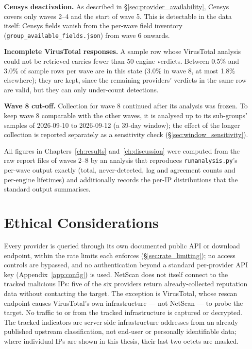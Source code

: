 \textbf{Censys deactivation.} As described in \S\ref{sec:provider_availability}, Censys covers only
waves 2--4 and the start of wave 5. This is detectable in the data itself: Censys fields vanish from
the per-wave field inventory (\texttt{group\_available\_fields.json}) from wave 6 onwards.

\textbf{Incomplete VirusTotal responses.} A sample row whose VirusTotal analysis could not be
retrieved carries fewer than 50 engine verdicts. Between 0.5\% and 3.0\% of sample rows per wave are
in this state (3.0\% in wave 8, at most 1.8\% elsewhere); they are kept, since the remaining providers' verdicts in the same row are valid, but
they can only under-count detections.

\textbf{Wave 8 cut-off.} Collection for wave 8 continued after its analysis was frozen. To keep wave
8 comparable with the other waves, it is analysed up to its sub-groups' samples of 2026-09-10 to
2026-09-12 (a 39-day window); the effect of the longer collection is reported separately as a
sensitivity check (\S\ref{sec:window_sensitivity}).

All figures in Chapters~\ref{ch:results} and~\ref{ch:discussion} were computed from the raw report
files of waves 2--8 by an analysis that reproduces \texttt{runanalysis.py}'s per-wave output exactly
(total, never-detected, lag and agreement counts and per-engine lifetimes) and additionally records
the per-IP distributions that the standard output summarises.

\section{Ethical Considerations}

Every provider is queried through its own documented public API or download endpoint, within the rate
limits each enforces (\S\ref{sec:rate_limiting}); no access controls are bypassed, and no
authentication beyond a standard per-provider API key (Appendix~\ref{app:config}) is used. NetScan
does not itself connect to the tracked malicious IPs: five of the six providers return
already-collected reputation data without contacting the target. The exception is VirusTotal, whose
rescan endpoint causes VirusTotal's own infrastructure --- not NetScan --- to probe the target. No
traffic to or from the tracked infrastructure is captured or decrypted. The tracked indicators are
server-side infrastructure addresses from an already published upstream classification, not
end-user or personally identifiable data; where individual IPs are shown in this thesis, their last
two octets are masked.


